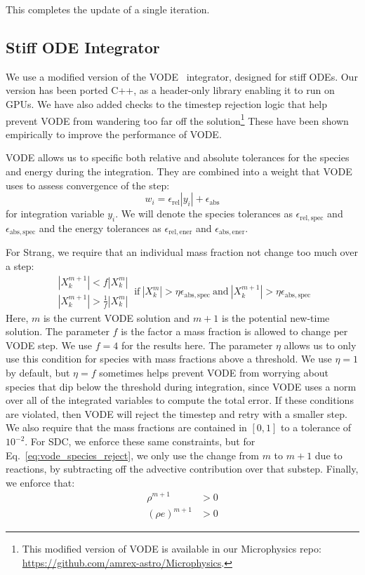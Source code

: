 \documentclass[times,preprint]{aastex631}
\newcommand{\atolspec}{{\epsilon_\mathrm{abs,spec}}}
\newcommand{\rtolspec}{{\epsilon_\mathrm{rel,spec}}}
\newcommand{\atolener}{{\epsilon_\mathrm{abs,ener}}}
\newcommand{\rtolener}{{\epsilon_\mathrm{rel,ener}}}
\begin{document}
This completes the update of a single iteration.

\subsection{Stiff ODE Integrator}

We use a modified version of the VODE~\citep{vode} integrator,
designed for stiff ODEs.  Our version has been ported C++, as a
header-only library enabling it to run on GPUs.  We have also added
checks to the timestep rejection logic that help prevent VODE from
wandering too far off the solution\footnote{This modified version of
VODE is available in our Microphysics repo:
\url{https://github.com/amrex-astro/Microphysics}.}  These have
been shown empirically to improve the performance of VODE.

VODE allows us to specific both relative and absolute tolerances
for the species and energy during the integration.  They are combined
into a weight that VODE uses to assess convergence of the step:
\begin{equation}
w_i = \epsilon_\mathrm{rel} |y_i| + \epsilon_\mathrm{abs}
\end{equation}
for integration variable $y_i$.  We will denote the species tolerances
as $\rtolspec$ and $\atolspec$ and the energy tolerances as $\rtolener$ and
$\atolener$.

For Strang, we require that
an individual mass fraction not change too much over a step:
\begin{equation}
\label{eq:vode_species_reject}
\begin{array}{c}|X_k^{m+1}| < f |X_k^m| \\ |X_k^{m+1}| > \frac{1}{f} |X_k^m| \end{array} ~  \mbox{if}~ |X_k^m| > \eta \atolspec ~\mbox{and}~ |X_k^{m+1}| > \eta \atolspec
\end{equation}
Here, $m$ is the current VODE solution and $m+1$ is the potential
new-time solution.  The parameter $f$ is the factor a mass fraction is
allowed to change per VODE step.  We use $f = 4$ for the results here.
The parameter $\eta$ allows us to only use this condition for species
with mass fractions above a threshold.  We use $\eta = 1$ by default,
but $\eta = f$ sometimes helps prevent VODE from worrying about
species that dip below the threshold during integration, since VODE
uses a norm over all of the integrated variables to compute the total
error.  If these conditions are violated, then VODE will reject the
timestep and retry with a smaller step.  We also require that the mass
fractions are contained in $[0, 1]$ to a tolerance of $10^{-2}$.
For SDC, we enforce these same constraints, but for
Eq.~\ref{eq:vode_species_reject}, we only use the change from $m$ to $m+1$ due
to reactions, by subtracting off the advective contribution over that substep.
Finally, we enforce that:
\begin{align}
\rho^{m+1} &> 0 \\
(\rho e)^{m+1} &> 0
\end{align}
\end{document}
